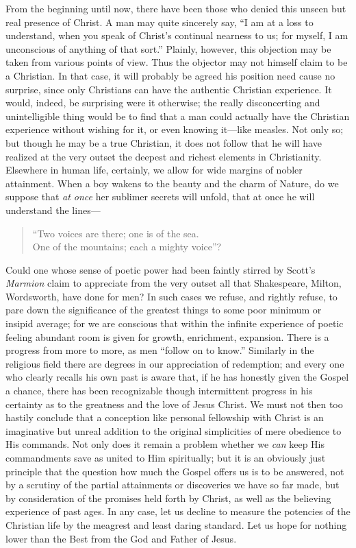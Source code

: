 \documentclass[12pt,a5paper,oneside]{book}
\begin{document}
From the beginning until now, there have
been those who denied this unseen but real
presence of Christ. A man may quite sincerely 
say, ``I am at a loss to understand,
when you speak of Christ's continual nearness 
to us; for myself, I am unconscious of
anything of that sort.'' Plainly, however, this
objection may be taken from various points of
view. Thus the objector may not himself
claim to be a Christian. In that case, it will
probably be agreed his position need cause no
surprise, since only Christians can have the
authentic Christian experience. It would,
indeed, be surprising were it otherwise; the
really disconcerting and unintelligible thing
would be to find that a man could actually
have the Christian experience without wishing
for it, or even knowing it---like measles.
Not only so; but though he may be a true
Christian, it does not follow that he will have
realized at the very outset the deepest and richest
elements in Christianity. Elsewhere in human
life, certainly, we allow for wide margins of
nobler attainment. When a boy wakens to
the beauty and the charm of Nature, do we
suppose that \textit{at once} her sublimer secrets will
unfold, that at once he will understand the
lines---
\begin{verse}
\small ``Two voices are there; one is of the sea. \\
One of the mountains; each a mighty voice''?
\end{verse}
Could one whose sense of poetic power had
been faintly stirred by Scott's \textit{Marmion} claim
to appreciate from the very outset all that
Shakespeare, Milton, Wordsworth, have done
for men? In such cases we refuse, and
rightly refuse, to pare down the significance of
the greatest things to some poor minimum or
insipid average; for we are conscious that
within the infinite experience of poetic feeling
abundant room is given for growth, enrichment, 
expansion. There is a progress from
more to more, as men ``follow on to know.''
Similarly in the religious field there are degrees
in our appreciation of redemption; and every
one who clearly recalls his own past is aware
that, if he has honestly given the Gospel a chance,
there has been recognizable though intermittent
progress in his certainty as to the greatness
and the love of Jesus Christ. We must not
then too hastily conclude that a conception
like personal fellowship with Christ is an
imaginative but unreal addition to the original
simplicities of mere obedience to His commands. 
Not only does it remain a problem
whether we \textit{can} keep His commandments
save as united to Him spiritually; but it is
an obviously just principle that the question
how much the Gospel offers us is to be answered,
not by a scrutiny of the partial attainments or
discoveries we have so far made, but by consideration 
of the promises held forth by Christ, as well
as the believing experience of past ages. In any
case, let us decline to measure the potencies of
the Christian life by the meagrest and least
daring standard. Let us hope for nothing
lower than the Best from the God and Father
of Jesus.
\end{document}
